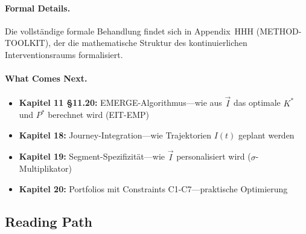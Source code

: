 \paragraph{Formal Details.}
Die vollst\"{a}ndige formale Behandlung findet sich in Appendix~HHH (METHOD-TOOLKIT), der die mathematische Struktur des kontinuierlichen Interventionsraums formalisiert.

\paragraph{What Comes Next.}
\begin{itemize}[nosep]
\item \textbf{Kapitel 11 §11.20:} EMERGE-Algorithmus---wie aus $\vec{I}$ das optimale $K^*$ und $P^*$ berechnet wird (EIT-EMP)
\item \textbf{Kapitel 18:} Journey-Integration---wie Trajektorien $I(t)$ geplant werden
\item \textbf{Kapitel 19:} Segment-Spezifizit\"{a}t---wie $\vec{I}$ personalisiert wird ($\sigma$-Multiplikator)
\item \textbf{Kapitel 20:} Portfolios mit Constraints C1-C7---praktische Optimierung
\end{itemize}


\subsection{Reading Path}
\label{sec:17-reading-path}

